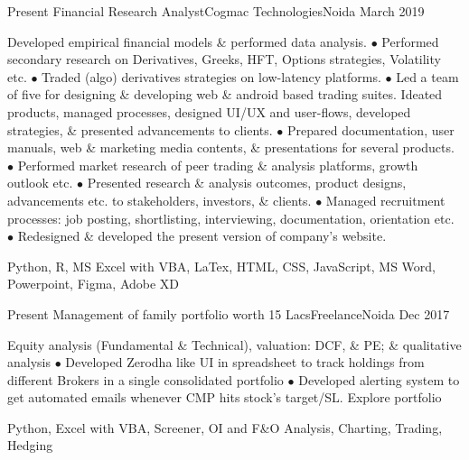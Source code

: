 
\begin{experiences}
  \experience
    {Present}   {Financial Research Analyst}{Cogmac Technologies}{Noida}
    {March 2019}
    {
\begin{description}
Developed empirical financial models \& performed data analysis. $\bullet$ Performed secondary research on Derivatives, Greeks, HFT, Options strategies, Volatility etc. $\bullet$ Traded (algo) derivatives strategies on low-latency platforms. $\bullet$ Led a team of five for designing \& developing web \& android based trading suites. Ideated products, managed processes, designed UI/UX and user-flows, developed strategies, \& presented advancements to clients. $\bullet$ Prepared documentation, user manuals, web \& marketing media contents, \& presentations for several products. $\bullet$ Performed market research of peer trading \& analysis platforms, growth outlook etc. $\bullet$ Presented research \& analysis outcomes, product designs, advancements etc. to stakeholders, investors, \& clients. $\bullet$ Managed recruitment processes: job posting, shortlisting, interviewing, documentation, orientation etc. $\bullet$ Redesigned \& developed the present version of company's website. \hspace \hfill {}
\end{description}
}
        {Python, R, MS Excel with VBA, LaTex, HTML, CSS, JavaScript, MS Word, Powerpoint, Figma, Adobe XD}
\end{experiences}
\vspace*{-15px} 
\begin{experiences}
   \experience
    {Present}{\vspace*{-15px} Management of family portfolio worth 15 Lacs}{Freelance}{Noida}
    {Dec 2017}
    {
\begin{description}
        Equity analysis (Fundamental \& Technical), valuation: DCF, \& PE; \& qualitative analysis $\bullet$ Developed Zerodha like UI in spreadsheet to track holdings from different Brokers in a single consolidated portfolio $\bullet$ Developed alerting system to get automated emails whenever CMP hits stock's target/SL. \hfill {} {\footnotesize{Explore portfolio}}
    \end{description}
    }
        {Python, Excel with VBA, Screener, OI and F\&O Analysis, Charting, Trading, Hedging}
\end{experiences}
